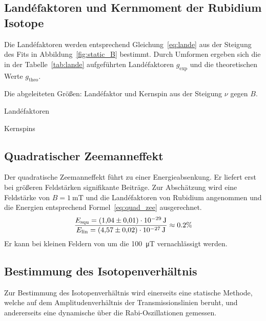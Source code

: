 \subsection{Land\'efaktoren und Kernmoment der Rubidium Isotope}%
\label{sub:landefaktoren_der_rubidium_isotope}
Die Land\'efaktoren werden entsprechend Gleichung~\ref{eq:lande} aus der Steigung
des Fits in Abbildung~\ref{fig:static_B} bestimmt.
Durch Umformen ergeben sich die in der Tabelle~\ref{tab:lande} aufgeführten
Land\'efaktoren $g_\text{exp}$ und die theoretischen Werte $g_\text{theo}$.
\begin{table}[h]
	\centering
	\caption{Die abgeleiteten Größen: Land\'efaktor und Kernspin aus der Steigung
	$\nu$ gegen $B$.}%
	\label{tab:lande}
	\begin{subtable}[t]{0.4\textwidth}
	\centering
	\caption{Land\'efaktoren}%
	\label{tab:label}
	
	\end{subtable}
	\begin{subtable}[t]{0.4\textwidth}
	\centering
	\caption{Kernspins}%
	\label{tab:label}
	
	\end{subtable}
\end{table}

\begin{table}[h]
\end{table}
\subsection{Quadratischer Zeemanneffekt}%
\label{sub:quadratischer_zeemanneffekt}
Der quadratische Zeemanneffekt führt zu einer Energieabsenkung.
Er liefert erst bei größeren Feldstärken signifikante Beiträge.
Zur Abschätzung wird eine Feldstärke von $B=\SI{1}{\milli\tesla}$
und die Land\'efaktoren von Rubidium angenommen und die Energien entsprechend
Formel~\ref{eq:quad_zee} ausgerechnet.
\begin{equation}
	\frac{E_\text{squ} = \SI{1.04 +- 0.01e-29}{\joule}}{E_\text{lin} =
		\SI{4.57 +- 0.02e-27}{\joule}} \approx 0.2 \%
\end{equation}
Er kann bei kleinen Feldern von um die \SI{100}{\micro\tesla} vernachlässigt werden.

\subsection{Bestimmung des Isotopenverhältnis}%
\label{sub:bestimmung_des_isotopenverhaeltniss}
Zur Bestimmung des Isotopenverhältnis wird einerseits eine statische Methode,
welche auf dem Amplitudenverhältnis der Transmissionslinien beruht,
und andererseits eine dynamische über die Rabi-Oszillationen gemessen.
